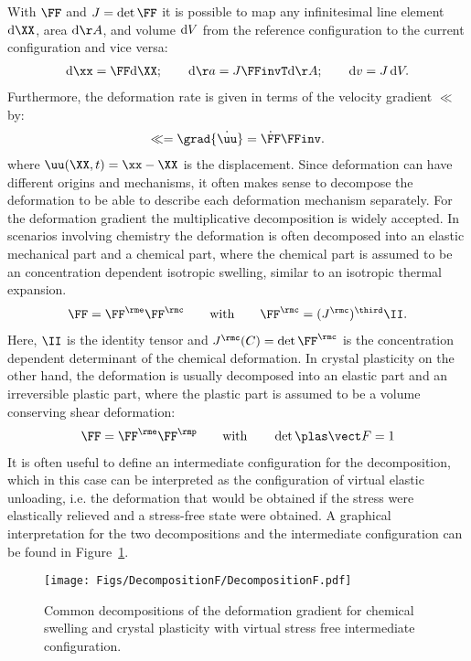 With $\FF$ and \mbox{$J=\det{\FF}$} it is possible to map any infinitesimal line element $\rmd\XX$, area $\rmd\AA$, and volume ${\rm d} V$ from the reference configuration to the current configuration and vice versa:
\begin{align}
  \rmd\xx = \FF\rmd\XX; \qquad \rmd\aa = J \FFinvT \rmd\AA; \qquad \rmd v = J\dV.
\end{align}
Furthermore, the deformation rate is given in terms of the velocity gradient $\ll$ by:
\begin{align}
  \ll = \grad{\dot{\uu}} = \dot\FF\FFinv.
  \label{eq:VelocityGradient}
\end{align}
where \mbox{$\uu(\XX,t)=\xx-\XX$} is the displacement. 
Since deformation can have different origins and mechanisms, it often makes sense to decompose the deformation to be able to describe each deformation mechanism separately. For the deformation gradient the multiplicative decomposition is widely accepted. In scenarios involving chemistry the deformation is often decomposed into an elastic mechanical part and a chemical part, where the chemical part is assumed to be an concentration dependent isotropic swelling, similar to an isotropic thermal expansion.
\begin{align}
  \FF=\FF^\rme\FF^\rmc \qquad \text{with}\qquad \FF^\rmc = (J^\rmc)^{\third}\II.
  \label{eq:FFeFFc}
\end{align} 
Here, $\II$ is the identity tensor and $J^\rmc(C)=\det{\FF^\rmc}$ is the concentration dependent determinant of the chemical deformation. In crystal plasticity on the other hand, the deformation is usually decomposed into an elastic part and an irreversible plastic part, where the plastic part is assumed to be a volume conserving shear deformation:
\begin{align}
  \FF = \FF^\rme\FF^\rmp \qquad \text{with}\qquad \det\FFp = 1
  \label{eq:FFeFFp}
\end{align}
It is often useful to define an intermediate configuration for the decomposition, which in this case can be interpreted as the configuration of virtual elastic unloading, i.e. the deformation that would be obtained if the stress were elastically relieved and a stress-free state were obtained. A graphical interpretation for the two decompositions and the intermediate configuration can be found in Figure~\ref{fig:DecompositionF}. 
\begin{figure}[h!]
  \centering
  \texttt{[image: Figs/DecompositionF/DecompositionF.pdf]}
  \caption{Common decompositions of the deformation gradient for chemical swelling and crystal plasticity with virtual stress free intermediate configuration.}
  \label{fig:DecompositionF}
\end{figure}

